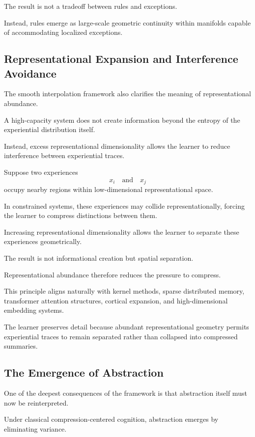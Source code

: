 \documentclass[12pt,a4paper]{article}
\begin{document}
The result is not a tradeoff between rules and exceptions.

Instead, rules emerge as large-scale geometric continuity within manifolds capable of accommodating localized exceptions.

\subsection{Representational Expansion and Interference Avoidance}

The smooth interpolation framework also clarifies the meaning of representational abundance.

A high-capacity system does not create information beyond the entropy of the experiential distribution itself.

Instead, excess representational dimensionality allows the learner to reduce interference between experiential traces.

Suppose two experiences
\[
x_i
\quad
\text{and}
\quad
x_j
\]
occupy nearby regions within low-dimensional representational space.

In constrained systems, these experiences may collide representationally, forcing the learner to compress distinctions between them.

Increasing representational dimensionality allows the learner to separate these experiences geometrically.

The result is not informational creation but spatial separation.

Representational abundance therefore reduces the pressure to compress.

This principle aligns naturally with kernel methods, sparse distributed memory, transformer attention structures, cortical expansion, and high-dimensional embedding systems.

The learner preserves detail because abundant representational geometry permits experiential traces to remain separated rather than collapsed into compressed summaries.

\subsection{The Emergence of Abstraction}

One of the deepest consequences of the framework is that abstraction itself must now be reinterpreted.

Under classical compression-centered cognition, abstraction emerges by eliminating variance.
\end{document}
